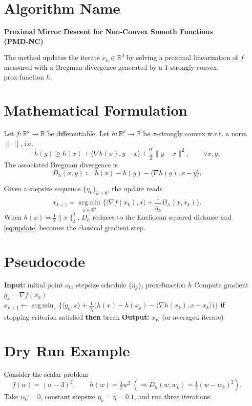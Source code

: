 \documentclass{article}
\newcommand{\argmin}{\operatorname*{arg\,min}}
\newcommand{\grad}{\nabla}
\newcommand{\D}{D_h}
\begin{document}
\section*{Algorithm Name}
\textbf{Proximal Mirror Descent for Non‑Convex Smooth Functions (PMD‑NC)}  

The method updates the iterate $x_k\in\mathbb{R}^d$ by solving a proximal linearization of $f$ measured with a Bregman divergence generated by a $1$‑strongly convex prox‑function $h$.

\section*{Mathematical Formulation}
Let $f:\mathbb{R}^d\rightarrow\mathbb{R}$ be differentiable.  
Let $h:\mathbb{R}^d\rightarrow\mathbb{R}$ be $\sigma$‑strongly convex w.r.t. a norm $\|\cdot\|$, i.e.
\[
h(y)\ge h(x)+\langle \grad h(x),y-x\rangle+\frac{\sigma}{2}\|y-x\|^{2},\qquad\forall x,y.
\]
The associated Bregman divergence is
\[
\D(x,y):=h(x)-h(y)-\langle \grad h(y),x-y\rangle .
\]

Given a stepsize sequence $\{\eta_k\}_{k\ge 0}$, the update reads
\begin{equation}
\boxed{
x_{k+1}= \argmin_{x\in\mathbb{R}^{d}}\Big\{ \langle \grad f(x_k),x\rangle+\frac{1}{\eta_k}\D(x,x_k)\Big\}.}
\label{eq:update}
\end{equation}
When $h(x)=\frac12\|x\|_2^{2}$, $\D$ reduces to the Euclidean squared distance and \eqref{eq:update} becomes the classical gradient step.

\section*{Pseudocode}
\begin{algorithm}[H]
\caption{PMD‑NC}
\begin{algorithmic}[1]
\State \textbf{Input:} initial point $x_0$, stepsize schedule $\{\eta_k\}$, prox‑function $h$
    \State Compute gradient $g_k=\grad f(x_k)$
    \State $x_{k+1}\gets\argmin_{x}\Big\{\langle g_k,x\rangle+\frac{1}{\eta_k}\big(h(x)-h(x_k)-\langle\grad h(x_k),x-x_k\rangle\big)\Big\}$
    \State \textbf{if} stopping criterion satisfied \textbf{then} break
\EndFor
\State \textbf{Output:} $x_{K}$ (or averaged iterate)
\end{algorithmic}
\end{algorithm}

\section*{Dry Run Example}
Consider the scalar problem
\[
f(w)=(w-3)^{2},\qquad h(w)=\tfrac12 w^{2}\;( \Rightarrow\D(w,w_k)=\tfrac12 (w-w_k)^{2}).
\]
Take $w_0=0$, constant stepsize $\eta_k=\eta=0.1$, and run three iterations.
\end{document}
